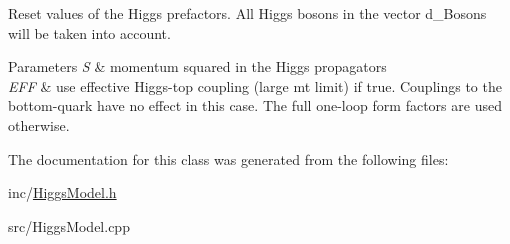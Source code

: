 Reset values of the Higgs prefactors. All Higgs bosons in the vector d\-\_\-\-Bosons will be taken into account. 


\begin{DoxyParams}{Parameters}
{\em S} & momentum squared in the Higgs propagators \\
\hline
{\em E\-F\-F} & use effective Higgs-\/top coupling (large mt limit) if true. Couplings to the bottom-\/quark have no effect in this case. The full one-\/loop form factors are used otherwise. \\
\hline
\end{DoxyParams}


The documentation for this class was generated from the following files\-:\begin{DoxyCompactItemize}
\item 
inc/\hyperlink{HiggsModel_8h}{Higgs\-Model.\-h}\item 
src/Higgs\-Model.\-cpp\end{DoxyCompactItemize}
